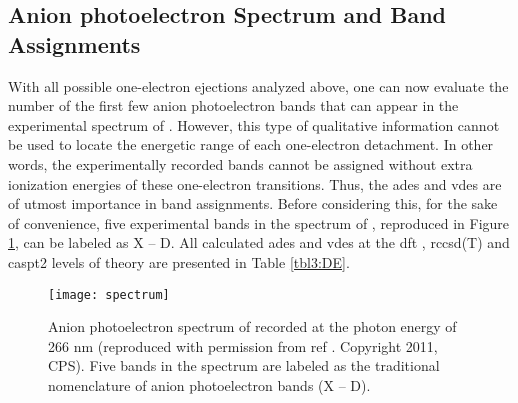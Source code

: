 \begin{refsection}
\subsection{Anion photoelectron Spectrum and Band Assignments}


With all possible one-electron ejections analyzed above, one can now evaluate the number of the first few anion photoelectron bands that can appear in the experimental spectrum of . However, this type of qualitative information cannot be used to locate the energetic range of each one-electron detachment. In other words, the experimentally recorded bands cannot be assigned without extra ionization energies of these one-electron transitions. Thus, the \acrshort{ade}s and \acrshort{vde}s are of utmost importance in band assignments. Before considering this, for the sake of convenience, five experimental bands in the spectrum of , reproduced in Figure \ref{fig3:spectrum}, can be labeled as X -- D. All calculated \acrshort{ade}s and \acrshort{vde}s at the \acrshort{dft} , \acrshort{rccsd}(T) and \acrshort{caspt2} levels of theory are presented in Table \ref{tbl3:DE}.


\begin{figure}[htb!]
	\centering
	\texttt{[image: spectrum]}
	\caption{Anion photoelectron spectrum of  recorded at the photon energy of 266 nm (reproduced with permission from ref . Copyright 2011, CPS). Five bands in the spectrum are labeled as the traditional nomenclature of anion photoelectron bands (X -- D).}
	\label{fig3:spectrum}
\end{figure}




\end{refsection}
